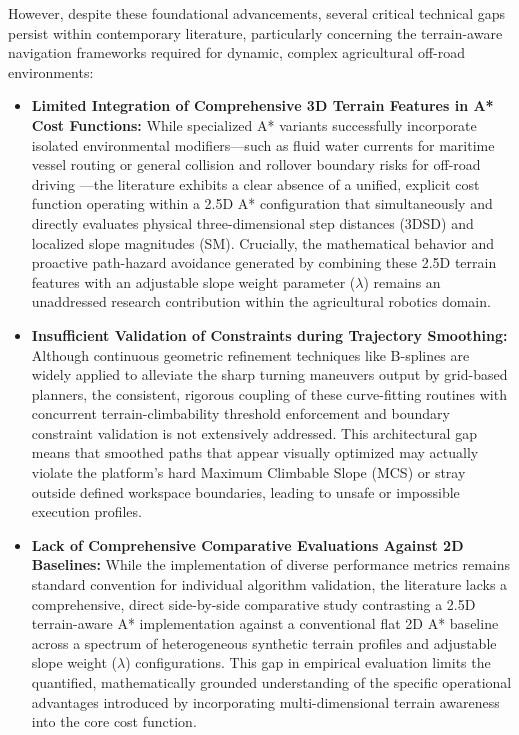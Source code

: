 However, despite these foundational advancements, several critical technical gaps persist within
contemporary literature, particularly concerning the terrain-aware navigation frameworks required
for dynamic, complex agricultural off-road environments:

\begin{itemize}
    \item \textbf{Limited Integration of Comprehensive 3D Terrain Features in A* Cost Functions:} While specialized A* variants successfully incorporate isolated environmental modifiers---such as fluid water currents for maritime vessel routing \citep{Zhuang_2019_improvedastar} or general collision and rollover boundary risks for off-road driving \citep{Li_2019_rolloverfreepath}---the literature exhibits a clear absence of a unified, explicit cost function operating within a 2.5D A* configuration that simultaneously and directly evaluates physical three-dimensional step distances (3DSD) and localized slope magnitudes (SM). Crucially, the mathematical behavior and proactive path-hazard avoidance generated by combining these 2.5D terrain features with an adjustable slope weight parameter ($\lambda$) remains an unaddressed research contribution within the agricultural robotics domain.

    \item \textbf{Insufficient Validation of Constraints during Trajectory Smoothing:} Although continuous geometric refinement techniques like B-splines are widely applied to alleviate the sharp turning maneuvers output by grid-based planners, the consistent, rigorous coupling of these curve-fitting routines with concurrent terrain-climbability threshold enforcement and boundary constraint validation is not extensively addressed. This architectural gap means that smoothed paths that appear visually optimized may actually violate the platform's hard Maximum Climbable Slope (MCS) or stray outside defined workspace boundaries, leading to unsafe or impossible execution profiles.

    \item \textbf{Lack of Comprehensive Comparative Evaluations Against 2D Baselines:} While the implementation of diverse performance metrics remains standard convention for individual algorithm validation, the literature lacks a comprehensive, direct side-by-side comparative study contrasting a 2.5D terrain-aware A* implementation against a conventional flat 2D A* baseline across a spectrum of heterogeneous synthetic terrain profiles and adjustable slope weight ($\lambda$) configurations. This gap in empirical evaluation limits the quantified, mathematically grounded understanding of the specific operational advantages introduced by incorporating multi-dimensional terrain awareness into the core cost function.
\end{itemize}

